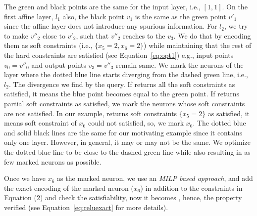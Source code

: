 The green and black points are the same for the input layer, i.e., $[1,1]$. On the first affine layer, $l_1$ 
also, the black point $v_1$ is the same as the green point $v'_1$ since the affine layer does not introduce any spurious information. 
For $l_2$, we try to make $v''_2$ close to $v'_2$, such that $v''_2$ reaches to the $v_3$. We do that by encoding 
them as soft constraints (i.e.,  $\{x_5=2, x_6=2\}$) 
while maintaining that the rest of the hard constraints are satisfied (see Equation~\ref{eq:opt1})
e.g., input points $v_0=v''_0$ and output points $v_3=v''_3$ remain same. 
We mark the neurons of the layer where the dotted blue line starts diverging from the dashed green line, i.e., $l_2$. 
The divergence we find by the \maxsat{} query. If \maxsat{} returns all the soft constraints as satisfied, it means
the blue point becomes equal to the green point. If \maxsat{} returns partial soft constraints as satisfied, 
we mark the neurons whose soft constraints are not satisfied. In our example, \maxsat{} returns 
soft constraints $\{x_5=2\}$ as satisfied, it means soft constraint of $x_6$ could not satisfied, so, we mark $x_6$.
The dotted blue and solid black lines are the same for our motivating example since it contains only one \relu{} layer. 
However, in general, it may or may not be the same. We optimize the dotted blue line to be close to the dashed green line while also resulting in as few marked neurons as  possible.




\noindent  
{}\;\;
  \begin{minipage}{0.42\linewidth}
Once we have  $x_6$ as the marked neuron, we use an {\em MILP based approach}, and add the exact encoding of the marked neuron ($x_6$) in addition to the constraints in Equation (2) %
and check the satisfiability, now it becomes \unsat{}, hence, the property verified (see Equation~\ref{eq:reluexact} for more details).
\end{minipage}

